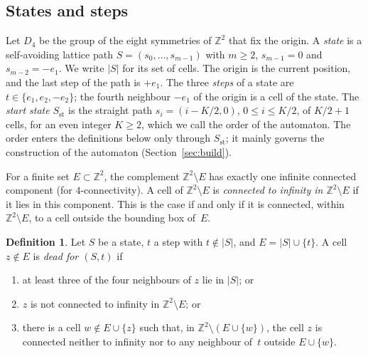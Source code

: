 \documentclass[11pt]{amsart}
\theoremstyle{definition}
\newtheorem{definition}[theorem]{Definition}
\theoremstyle{remark}
\numberwithin{equation}{section}
\newcommand{\Z}{\mathbb{Z}}
\begin{document}
\subsection{States and steps}
Let $D_4$ be the group of the eight symmetries of $\Z^2$ that fix the origin. A \emph{state} is a self-avoiding lattice path $S=(s_0,\dots,s_{m-1})$ with $m\ge2$, $s_{m-1}=0$ and $s_{m-2}=-e_1$. We write $|S|$ for its set of cells. The origin is the current position, and the last step of the path is $+e_1$. The three \emph{steps} of a state are $t\in\{e_1,e_2,-e_2\}$; the fourth neighbour $-e_1$ of the origin is a cell of the state. The \emph{start state} $S_\mathrm{st}$ is the straight path $s_i=(i-K/2,0)$, $0\le i\le K/2$, of $K/2+1$ cells, for an even integer $K\ge2$, which we call the order of the automaton. The order enters the definitions below only through $S_\mathrm{st}$; it mainly governs the construction of the automaton (Section~\ref{sec:build}).

For a finite set $E\subset\Z^2$, the complement $\Z^2\setminus E$ has exactly one infinite connected component (for $4$-connectivity). A cell of $\Z^2\setminus E$ is \emph{connected to infinity in $\Z^2\setminus E$} if it lies in this component. This is the case if and only if it is connected, within $\Z^2\setminus E$, to a cell outside the bounding box of~$E$.

\begin{definition}\label{def:dead}
Let $S$ be a state, $t$ a step with $t\notin|S|$, and $E=|S|\cup\{t\}$. A cell $z\notin E$ is \emph{dead for $(S,t)$} if
\begin{enumerate}[label=(\alph*)]
\item at least three of the four neighbours of $z$ lie in $|S|$; or
\item $z$ is not connected to infinity in $\Z^2\setminus E$; or
\item there is a cell $w\notin E\cup\{z\}$ such that, in $\Z^2\setminus(E\cup\{w\})$, the cell $z$ is connected neither to infinity nor to any neighbour of~$t$ outside $E\cup\{w\}$.
\end{enumerate}
\end{definition}
\end{document}
